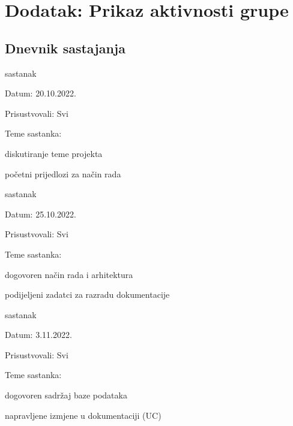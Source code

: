 \chapter*{Dodatak: Prikaz aktivnosti grupe}

    \section*{Dnevnik sastajanja}
    
    \begin{packed_enum}
        \item sastanak
        
        \item[] \begin{packed_item}
				\item Datum: 20.10.2022.
				\item Prisustvovali: Svi
				\item Teme sastanka:
				\begin{packed_item}
					\item  diskutiranje teme projekta
					\item  početni prijedlozi za način rada
				\end{packed_item}
			\end{packed_item}
			
		\item sastanak
        
        \item[] \begin{packed_item}
				\item Datum: 25.10.2022.
				\item Prisustvovali: Svi
				\item Teme sastanka:
				\begin{packed_item}
					\item  dogovoren način rada i arhitektura
					\item  podijeljeni zadatci za razradu dokumentacije
				\end{packed_item}
			\end{packed_item}
			
		\item sastanak
        
        \item[] \begin{packed_item}
				\item Datum: 3.11.2022.
				\item Prisustvovali: Svi
				\item Teme sastanka:
				\begin{packed_item}
					\item  dogovoren sadržaj baze podataka
					\item  napravljene izmjene u dokumentaciji (UC)
				\end{packed_item}
			\end{packed_item}


\end{packed_enum}
